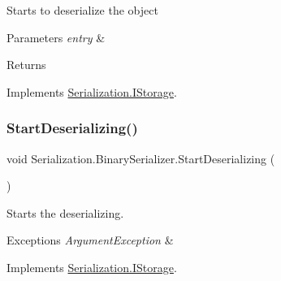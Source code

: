 Starts to deserialize the object 


\begin{DoxyParams}{Parameters}
{\em entry} & \\
\hline
\end{DoxyParams}
\begin{DoxyReturn}{Returns}

\end{DoxyReturn}


Implements \hyperlink{interface_serialization_1_1_i_storage_a90aa19f79a51acf057f20da842ef09b3}{Serialization.\+I\+Storage}.

\mbox{\label{class_serialization_1_1_binary_serializer_a379a76963492f1fb3a8168e794148683}} 
\subsubsection{\texorpdfstring{Start\+Deserializing()}{StartDeserializing()}\hspace{0.1cm}{\footnotesize\ttfamily [2/2]}}
{\footnotesize\ttfamily void Serialization.\+Binary\+Serializer.\+Start\+Deserializing (\begin{DoxyParamCaption}{ }\end{DoxyParamCaption})\hspace{0.3cm}{\ttfamily [inline]}}



Starts the deserializing. 


\begin{DoxyExceptions}{Exceptions}
{\em Argument\+Exception} & \\
\hline
\end{DoxyExceptions}


Implements \hyperlink{interface_serialization_1_1_i_storage_ab0432907fec979aa0832b659b4bd8d67}{Serialization.\+I\+Storage}.

\mbox{\label{class_serialization_1_1_binary_serializer_aef0fdf4b432dfe09b1bf9c11786dee58}} 

